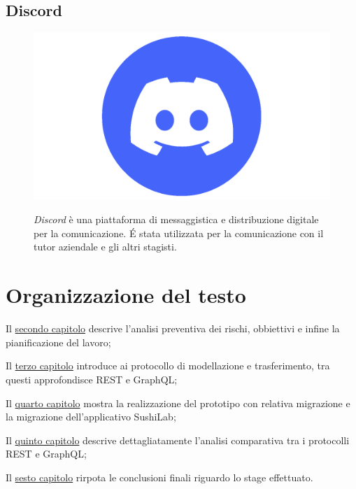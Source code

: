 \subsection*{Discord}
\FloatBarrier
\begin{figure}[!h]
  \begin{minipage}[h]{0.3\linewidth}
    \centering
    \includegraphics[width=0.7\linewidth]{immagini/discord.png}
  \end{minipage}
  \begin{minipage}[!h]{0.7\linewidth}
    \textit{Discord} è una piattaforma di messaggistica e distribuzione digitale per la comunicazione. É stata utilizzata per la comunicazione con il tutor aziendale e gli altri stagisti.
  \end{minipage}
\end{figure}
\FloatBarrier
\section{Organizzazione del testo}
\begin{description}
    \item Il {\hyperref[descrizione-stage]{secondo capitolo}} descrive l'analisi preventiva dei rischi, obbiettivi e infine la pianificazione del lavoro;

    \item Il {\hyperref[protocolli-trasmissione-dati]{terzo capitolo}} introduce ai protocollo di modellazione e trasferimento, tra questi approfondisce REST e GraphQL;

    \item Il {\hyperref[casi-uso]{quarto capitolo}} mostra la realizzazione del prototipo con relativa migrazione e la migrazione dell'applicativo SushiLab;

    \item Il {\hyperref[analisi-comparativa]{quinto capitolo}} descrive dettagliatamente l'analisi comparativa tra i protocolli REST e GraphQL;

    \item Il {\hyperref[conclusioni]{sesto capitolo}} rirpota le conclusioni finali riguardo lo stage effettuato.
\end{description}

